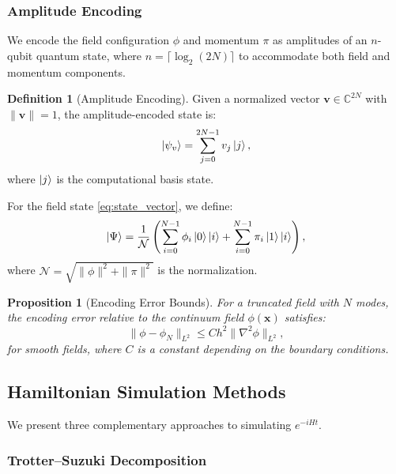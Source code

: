 \documentclass[11pt,a4paper]{article}
\newcommand{\vecx}{\bm{x}}
\theoremstyle{plain}
\newtheorem{proposition}[theorem]{Proposition}
\theoremstyle{definition}
\newtheorem{definition}[theorem]{Definition}
\theoremstyle{remark}
\begin{document}
\subsubsection{Amplitude Encoding}

We encode the field configuration $\phi$ and momentum $\pi$ as amplitudes of an $n$-qubit quantum state, where $n = \lceil\log_2(2N)\rceil$ to accommodate both field and momentum components.

\begin{definition}[Amplitude Encoding]
Given a normalized vector $\bm{v} \in \mathbb{C}^{2N}$ with $\|\bm{v}\| = 1$, the amplitude-encoded state is:
\begin{equation}\label{eq:amplitude_encoding}
    \ket{\psi_v} = \sum_{j=0}^{2N-1} v_j \ket{j},
\end{equation}
where $\ket{j}$ is the computational basis state.
\end{definition}

For the field state \eqref{eq:state_vector}, we define:
\begin{equation}
    \ket{\Psi} = \frac{1}{\mathcal{N}}\left(\sum_{i=0}^{N-1} \phi_i \ket{0}\ket{i} + \sum_{i=0}^{N-1} \pi_i \ket{1}\ket{i}\right),
\end{equation}
where $\mathcal{N} = \sqrt{\|\phi\|^2 + \|\pi\|^2}$ is the normalization.

\begin{proposition}[Encoding Error Bounds]
For a truncated field with $N$ modes, the encoding error relative to the continuum field $\phi(\vecx)$ satisfies:
\begin{equation}
    \|\phi - \phi_N\|_{L^2} \leq C h^2 \|\nabla^2\phi\|_{L^2},
\end{equation}
for smooth fields, where $C$ is a constant depending on the boundary conditions.
\end{proposition}

\subsection{Hamiltonian Simulation Methods}\label{subsec:hamiltonian_simulation}

We present three complementary approaches to simulating $e^{-iHt}$.

\subsubsection{Trotter--Suzuki Decomposition}
\end{document}
